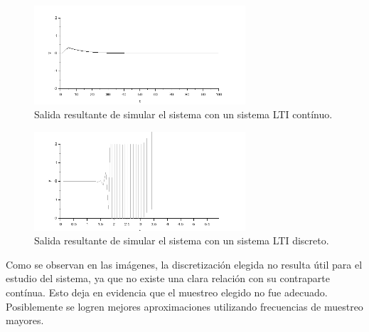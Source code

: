 \documentclass{article}
\begin{document}
         \begin{figure}[h!]
            \centering
            \includegraphics[width=0.7\textwidth]{amortiguador_10}
            \caption{Salida resultante de simular el sistema con un sistema LTI contínuo.}
            \label{sistemaContinuo}
        \end{figure}
        
              \begin{figure}[h!]
            \centering
            \includegraphics[width=0.7\textwidth]{discreto.png}
            \caption{Salida resultante de simular el sistema con un sistema LTI discreto.}
            \label{sistemaDiscreto}
        \end{figure}

Como se observan en las imágenes, la discretización elegida no resulta útil para el estudio del sistema, ya que no existe una clara relación con su contraparte contínua. Esto deja en evidencia que el muestreo elegido no fue adecuado. Posiblemente se logren mejores aproximaciones utilizando frecuencias de muestreo mayores.








    
\end{document}
